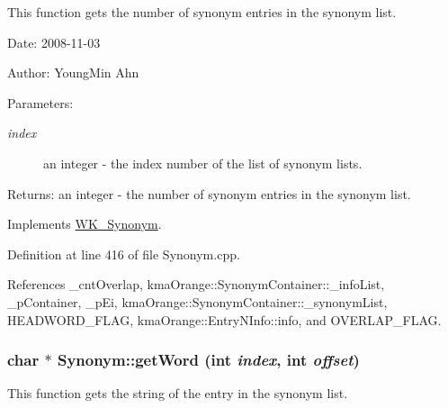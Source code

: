This function gets the number of synonym entries in the synonym list. 

\begin{Desc}
\item[Date:]2008-11-03 \end{Desc}
\begin{Desc}
\item[Author:]YoungMin Ahn \end{Desc}
\begin{Desc}
\item[Parameters:]
\begin{description}
\item[{\em index}]an integer - the index number of the list of synonym lists. \end{description}
\end{Desc}
\begin{Desc}
\item[Returns:]an integer - the number of synonym entries in the synonym list. \end{Desc}


Implements \hyperlink{classWK__Synonym_3a50ddb83a62f2bf3fa3d4317ea42742}{WK\_\-Synonym}.

Definition at line 416 of file Synonym.cpp.

References \_\-cntOverlap, kmaOrange::SynonymContainer::\_\-infoList, \_\-pContainer, \_\-pEi, kmaOrange::SynonymContainer::\_\-synonymList, HEADWORD\_\-FLAG, kmaOrange::EntryNInfo::info, and OVERLAP\_\-FLAG.\hypertarget{classkmaOrange_1_1Synonym_96f92eecdd58a5be11e411cbb6eeb087}{
\subsubsection[{getWord}]{\setlength{\rightskip}{0pt plus 5cm}char $\ast$ Synonym::getWord (int {\em index}, \/  int {\em offset})}}
\label{classkmaOrange_1_1Synonym_96f92eecdd58a5be11e411cbb6eeb087}


This function gets the string of the entry in the synonym list. 

